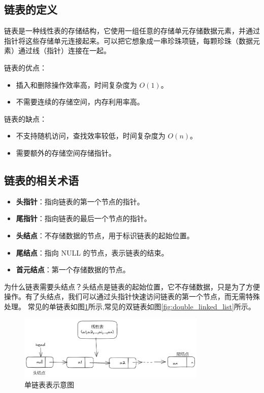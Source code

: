 \documentclass[lang=cn,newtx,10pt,scheme=chinese]{elegantbook}
\begin{document}
\subsection{链表的定义}
链表是一种线性表的存储结构，它使用一组任意的存储单元存储数据元素，并通过指针将这些存储单元连接起来。可以把它想象成一串珍珠项链，每颗珍珠（数据元素）通过线（指针）连接在一起。

链表的优点：
\begin{itemize}
    \item 插入和删除操作效率高，时间复杂度为 $O(1)$。
    \item 不需要连续的存储空间，内存利用率高。
\end{itemize}

链表的缺点：
\begin{itemize}
    \item 不支持随机访问，查找效率较低，时间复杂度为 $O(n)$。
    \item 需要额外的存储空间存储指针。
\end{itemize}

\subsection{链表的相关术语}
\begin{itemize}
  \item \textbf{头指针}：指向链表的第一个节点的指针。
  \item \textbf{尾指针}：指向链表的最后一个节点的指针。
  \item \textbf{头结点}：不存储数据的节点，用于标识链表的起始位置。
  \item \textbf{尾结点}：指向 NULL 的节点，表示链表的结束。
  \item \textbf{首元结点}：第一个存储数据的节点。
\end{itemize}
为什么链表需要头结点？头结点是链表的起始位置，它不存储数据，只是为了方便操作。有了头结点，我们可以通过头指针快速访问链表的第一个节点，而无需特殊处理。
常见的单链表如图\ref{fig:single_linked_list}所示,常见的双链表如图\ref{fig:double_linked_list}所示。
\begin{figure}[h]
  \centering
  \includegraphics[width=0.8\textwidth]{./image/singleLink.png}
  \caption{单链表表示意图}
  \label{fig:single_linked_list}
\end{figure}
\end{document}
